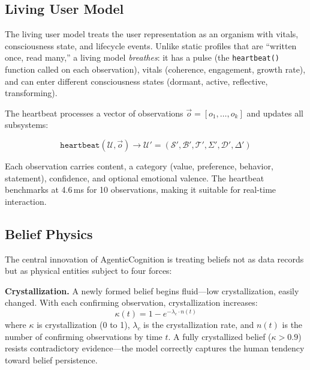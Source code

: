 \documentclass[10pt, twocolumn]{article}
\begin{document}
\subsection{Living User Model}
\label{sec:living}

The living user model treats the user representation as an organism with vitals, consciousness state, and lifecycle events. Unlike static profiles that are ``written once, read many,'' a living model \emph{breathes}: it has a pulse (the \texttt{heartbeat()} function called on each observation), vitals (coherence, engagement, growth rate), and can enter different consciousness states (dormant, active, reflective, transforming).

The heartbeat processes a vector of observations $\vec{o} = [o_1, \ldots, o_k]$ and updates all subsystems:

\begin{equation}
\texttt{heartbeat}(\mathcal{U}, \vec{o}) \rightarrow \mathcal{U}' = (\mathcal{S}', \mathcal{B}', \mathcal{T}', \Sigma', \mathcal{D}', \Delta')
\end{equation}

Each observation carries content, a category (value, preference, behavior, statement), confidence, and optional emotional valence. The heartbeat benchmarks at 4.6\,ms for 10 observations, making it suitable for real-time interaction.

\subsection{Belief Physics}
\label{sec:belief_physics}

The central innovation of AgenticCognition is treating beliefs not as data records but as physical entities subject to four forces:

\textbf{Crystallization.} A newly formed belief begins fluid---low crystallization, easily changed. With each confirming observation, crystallization increases:
\begin{equation}
\kappa(t) = 1 - e^{-\lambda_c \cdot n(t)}
\end{equation}
where $\kappa$ is crystallization (0 to 1), $\lambda_c$ is the crystallization rate, and $n(t)$ is the number of confirming observations by time $t$. A fully crystallized belief ($\kappa > 0.9$) resists contradictory evidence---the model correctly captures the human tendency toward belief persistence.
\end{document}
